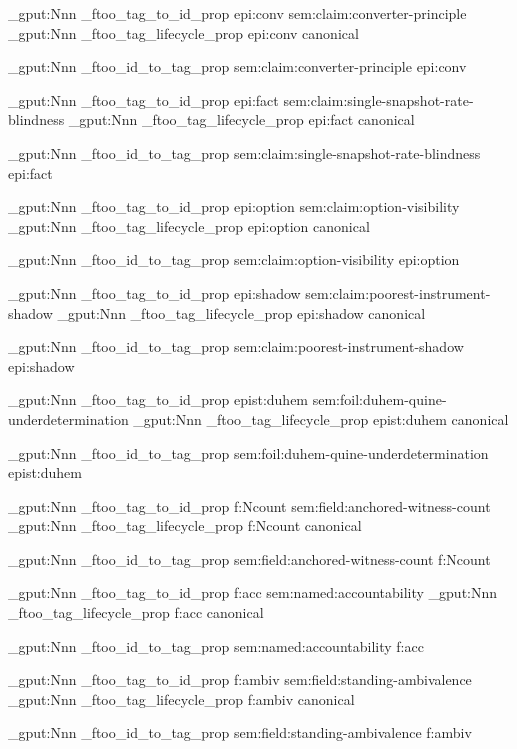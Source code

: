 \prop_gput:Nnn \g_ftoo_tag_to_id_prop { epi:conv } { sem:claim:converter-principle }
\prop_gput:Nnn \g_ftoo_tag_lifecycle_prop { epi:conv } { canonical }

\prop_gput:Nnn \g_ftoo_id_to_tag_prop { sem:claim:converter-principle } { epi:conv }


\prop_gput:Nnn \g_ftoo_tag_to_id_prop { epi:fact } { sem:claim:single-snapshot-rate-blindness }
\prop_gput:Nnn \g_ftoo_tag_lifecycle_prop { epi:fact } { canonical }

\prop_gput:Nnn \g_ftoo_id_to_tag_prop { sem:claim:single-snapshot-rate-blindness } { epi:fact }


\prop_gput:Nnn \g_ftoo_tag_to_id_prop { epi:option } { sem:claim:option-visibility }
\prop_gput:Nnn \g_ftoo_tag_lifecycle_prop { epi:option } { canonical }

\prop_gput:Nnn \g_ftoo_id_to_tag_prop { sem:claim:option-visibility } { epi:option }


\prop_gput:Nnn \g_ftoo_tag_to_id_prop { epi:shadow } { sem:claim:poorest-instrument-shadow }
\prop_gput:Nnn \g_ftoo_tag_lifecycle_prop { epi:shadow } { canonical }

\prop_gput:Nnn \g_ftoo_id_to_tag_prop { sem:claim:poorest-instrument-shadow } { epi:shadow }


\prop_gput:Nnn \g_ftoo_tag_to_id_prop { epist:duhem } { sem:foil:duhem-quine-underdetermination }
\prop_gput:Nnn \g_ftoo_tag_lifecycle_prop { epist:duhem } { canonical }

\prop_gput:Nnn \g_ftoo_id_to_tag_prop { sem:foil:duhem-quine-underdetermination } { epist:duhem }


\prop_gput:Nnn \g_ftoo_tag_to_id_prop { f:Ncount } { sem:field:anchored-witness-count }
\prop_gput:Nnn \g_ftoo_tag_lifecycle_prop { f:Ncount } { canonical }

\prop_gput:Nnn \g_ftoo_id_to_tag_prop { sem:field:anchored-witness-count } { f:Ncount }


\prop_gput:Nnn \g_ftoo_tag_to_id_prop { f:acc } { sem:named:accountability }
\prop_gput:Nnn \g_ftoo_tag_lifecycle_prop { f:acc } { canonical }

\prop_gput:Nnn \g_ftoo_id_to_tag_prop { sem:named:accountability } { f:acc }


\prop_gput:Nnn \g_ftoo_tag_to_id_prop { f:ambiv } { sem:field:standing-ambivalence }
\prop_gput:Nnn \g_ftoo_tag_lifecycle_prop { f:ambiv } { canonical }

\prop_gput:Nnn \g_ftoo_id_to_tag_prop { sem:field:standing-ambivalence } { f:ambiv }


